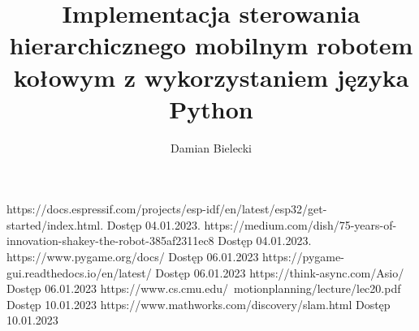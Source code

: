 \documentclass[12pt,twoside]{article}
\author{Damian Bielecki}
\title{Implementacja sterowania hierarchicznego mobilnym robotem kołowym z wykorzystaniem języka Python}
\begin{document}
\maketitle

\blankpage

\tableofcontents
\clearpage
\blankpage










	


\clearpage
	
	
\begin{thebibliography}{4}
	 https://docs.espressif.com/projects/esp-idf/en/latest/esp32/get-started/index.html. Dostęp 04.01.2023.
	 https://medium.com/dish/75-years-of-innovation-shakey-the-robot-385af2311ec8 Dostęp 04.01.2023.
	 https://www.pygame.org/docs/ Dostęp 06.01.2023
	 https://pygame-gui.readthedocs.io/en/latest/ Dostęp 06.01.2023
	 https://think-async.com/Asio/ Dostęp 06.01.2023
	 https://www.cs.cmu.edu/~motionplanning/lecture/lec20.pdf Dostęp 10.01.2023
	 https://www.mathworks.com/discovery/slam.html Dostęp 10.01.2023
\end{thebibliography}
	
\clearpage
	
\end{document}
